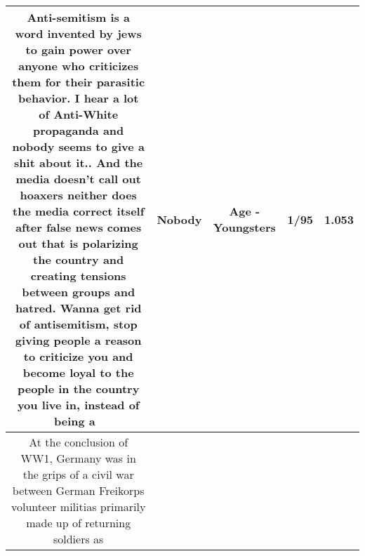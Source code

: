 \documentclass[11pt]{article}
\newlength\mylength
\begin{document}
\begin{center}
\begin{longtable}{|C{.65\mylength}|C{.30\mylength}|C{.12\mylength}|C{.12\mylength}|C{.12\mylength}|}
  \small Anti-semitism is a word invented by jews to gain power over anyone who criticizes them for their parasitic behavior. I hear a lot of Anti-White propaganda and \textbf{nobody} seems to give a shit about it.. And the media doesn't call out hoaxers neither does the media correct itself after false news comes out that is polarizing the country and creating tensions between groups and hatred. Wanna get rid of antisemitism, stop giving people a reason to criticize you and become loyal to the people in the country you live in, instead of being a 🦠\normalsize   & Nobody & Age - Youngsters & 1/95 & 1.053 \\  \hline
  \small At the conclusion of WW1, Germany was in the grips of a civil war between German Freikorps volunteer militias primarily made up of returning soldiers as 


\end{longtable}
\end{center}
\end{document}
